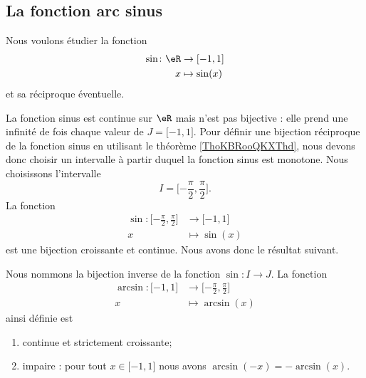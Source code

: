 \subsection{La fonction arc sinus}

Nous voulons étudier la fonction
\begin{equation}
    \begin{aligned}
        \sin\colon \eR&\to \mathopen[ -1 , 1 \mathclose] \\
        x&\mapsto \sin(x) 
    \end{aligned}
\end{equation}
et sa réciproque éventuelle.

La fonction sinus est continue sur \( \eR\) mais n'est pas bijective : elle prend une infinité de fois chaque valeur de \( J=\mathopen[ -1 , 1 \mathclose]\). Pour définir une bijection réciproque de la fonction sinus en utilisant le théorème \ref{ThoKBRooQKXThd}, nous devons donc choisir un intervalle à partir duquel la fonction sinus est monotone. Nous choisissons l'intervalle
\begin{equation}
    I=\mathopen[ -\frac{ \pi }{ 2 } , \frac{ \pi }{2} \mathclose].
\end{equation}
La fonction
\begin{equation}
    \begin{aligned}
        \sin\colon \mathopen[ -\frac{ \pi }{2} , \frac{ \pi }{2} \mathclose]&\to \mathopen[ -1 , 1 \mathclose] \\
        x&\mapsto \sin(x) 
    \end{aligned}
\end{equation}
est une bijection croissante et continue. Nous avons donc le résultat suivant.
\begin{theorem}
    Nous nommons  la bijection inverse de la fonction \( \sin\colon I\to J\). La fonction
    \begin{equation}
        \begin{aligned}
            \arcsin\colon \mathopen[ -1 , 1 \mathclose]&\to \mathopen[ -\frac{ \pi }{2} , \frac{ \pi }{2} \mathclose] \\
            x&\mapsto \arcsin(x) 
        \end{aligned}
    \end{equation}
    ainsi définie est
    \begin{enumerate}
        \item
            continue et strictement croissante;
        \item
            impaire : pour tout \( x\in\mathopen[ -1 , 1 \mathclose]\) nous avons \( \arcsin(-x)=-\arcsin(x)\).
    \end{enumerate}
\end{theorem}


